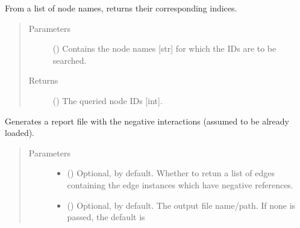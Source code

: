 \documentclass[letterpaper,10pt,english]{sphinxmanual}
\begin{document}
\begin{fulllineitems}
\begin{fulllineitems}
\end{fulllineitems}


\begin{fulllineitems}
\label{\detokenize{reference:pypath.main.PyPath.names2vids}}
From a list of node names, returns their corresponding indices.
\begin{quote}\begin{description}
\item[{Parameters}] \leavevmode
{} () \textendash{} Contains the node names {[}str{]} for which the IDs are to be
searched.

\item[{Returns}] \leavevmode
() \textendash{} The queried node IDs {[}int{]}.

\end{description}\end{quote}

\end{fulllineitems}


\begin{fulllineitems}
\label{\detokenize{reference:pypath.main.PyPath.negative_report}}
Generates a report file with the negative interactions (assumed
to be already loaded).
\begin{quote}\begin{description}
\item[{Parameters}] \leavevmode\begin{itemize}
\item {} 
 () \textendash{} Optional,  by default. Whether to retun a list of
edges containing the edge instances which have negative
references.

\item {} 
 () \textendash{} Optional,  by default. The output file name/path. If
none is passed, the default is


\end{itemize}
\end{description}
\end{quote}
\end{fulllineitems}
\end{fulllineitems}
\end{document}
